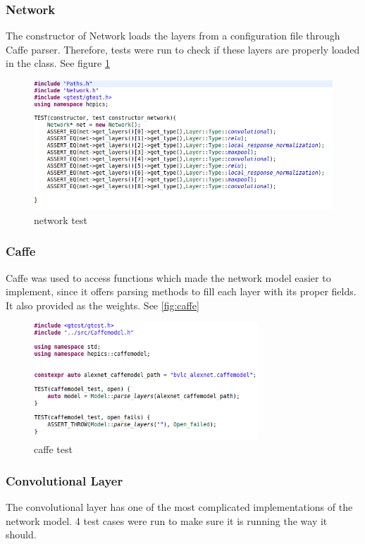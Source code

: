 \documentclass[parskip=full]{scrartcl}
\begin{document}
\subsubsection{Network}
The constructor of Network loads the layers from a configuration file through Caffe parser. Therefore, tests were run to check if these layers are properly loaded in the class. See figure \ref{fig:network_test} %

\begin{figure}[h]
		\centering
		\includegraphics[width=1\textwidth]{network_test}
		\caption{network test}
		\label{fig:network_test}
\end{figure}

\subsubsection{Caffe}
Caffe was used to access functions which made the network model easier to implement, since it offers parsing methods to fill each layer with its proper fields. It also provided as the weights. See \ref{fig:caffe} %

\begin{figure}[h]
		\centering
		\includegraphics[width=0.75\textwidth]{caffe_test}
		\caption{caffe test}
		\label{fig:caffe_test}
\end{figure}

\subsubsection{Convolutional Layer}
The convolutional layer has one of the most complicated implementations of the network model. 4 test cases were run to make sure it is running the way it should.
\end{document}
